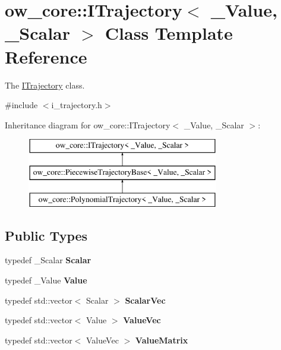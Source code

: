 \hypertarget{classow__core_1_1ITrajectory}{}\section{ow\+\_\+core\+:\+:I\+Trajectory$<$ \+\_\+\+Value, \+\_\+\+Scalar $>$ Class Template Reference}
\label{classow__core_1_1ITrajectory}


The \hyperlink{classow__core_1_1ITrajectory}{I\+Trajectory} class.  




{\ttfamily \#include $<$i\+\_\+trajectory.\+h$>$}

Inheritance diagram for ow\+\_\+core\+:\+:I\+Trajectory$<$ \+\_\+\+Value, \+\_\+\+Scalar $>$\+:\begin{figure}[H]
\begin{center}
\leavevmode
\includegraphics[height=3.000000cm]{d0/d1d/classow__core_1_1ITrajectory}
\end{center}
\end{figure}
\subsection*{Public Types}
\begin{DoxyCompactItemize}
\item 
typedef \+\_\+\+Scalar {\bfseries Scalar}\hypertarget{classow__core_1_1ITrajectory_a10b1fa281da84428d5af9816fc34e538}{}\label{classow__core_1_1ITrajectory_a10b1fa281da84428d5af9816fc34e538}

\item 
typedef \+\_\+\+Value {\bfseries Value}\hypertarget{classow__core_1_1ITrajectory_ae79d7e06dd767f47eb357758e6b7b9fd}{}\label{classow__core_1_1ITrajectory_ae79d7e06dd767f47eb357758e6b7b9fd}

\item 
typedef std\+::vector$<$ Scalar $>$ {\bfseries Scalar\+Vec}\hypertarget{classow__core_1_1ITrajectory_a01d1447b4f6cbdcbcf33d9566f8d4e11}{}\label{classow__core_1_1ITrajectory_a01d1447b4f6cbdcbcf33d9566f8d4e11}

\item 
typedef std\+::vector$<$ Value $>$ {\bfseries Value\+Vec}\hypertarget{classow__core_1_1ITrajectory_ab4bd802b0d53b33b88aabcc492c2b088}{}\label{classow__core_1_1ITrajectory_ab4bd802b0d53b33b88aabcc492c2b088}

\item 
typedef std\+::vector$<$ Value\+Vec $>$ {\bfseries Value\+Matrix}\hypertarget{classow__core_1_1ITrajectory_a845cf3efa4cad8299d3307602cd41f18}{}\label{classow__core_1_1ITrajectory_a845cf3efa4cad8299d3307602cd41f18}

\end{DoxyCompactItemize}

